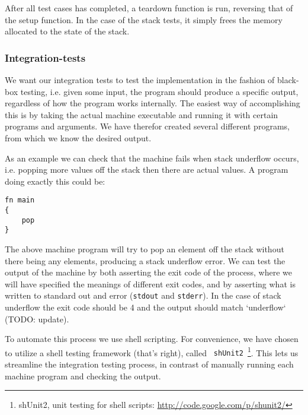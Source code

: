 After all test cases has completed, a teardown function is run, reversing that
of the setup function. In the case of the stack tests, it simply frees the
memory allocated to the state of the stack.
%


\subsubsection{Integration-tests}
We want our integration tests to test the implementation in the fashion of
black-box testing, i.e. given some input, the program should produce a specific
output, regardless of how the program works internally. The easiest way of
accomplishing this is by taking the actual machine executable and running it
with certain programs and arguments. We have therefor created several different
programs, from which we know the desired output.

As an example we can check that the machine fails when stack underflow occurs,
i.e. popping more values off the stack then there are actual values. A program
doing exactly this could be:
\begin{lstlisting}[language={bytecode},caption={Machine program producing
stack underflow}]
fn main
{
	pop
}
\end{lstlisting}

The above machine program will try to pop an element off the stack without there
being any elements, producing a stack underflow error. We can test the output of
the machine by both asserting the exit code of the process, where we will have
specified the meanings of different exit codes, and by asserting what is written
to standard out and error ({\tt stdout} and {\tt stderr}). In the case of stack
underflow the exit code should be 4 and the output should match `underflow`
(TODO: update).

To automate this process we use shell scripting. For convenience, we have chosen
to utilize a shell testing framework (that's right), called {\tt
  shUnit2}~\footnote{shUnit2, unit testing for shell scripts:
  \url{http://code.google.com/p/shunit2/}}. This lets us streamline the
integration testing process, in contrast of manually running each machine
program and checking the output.

